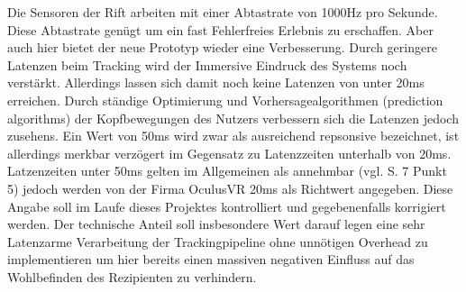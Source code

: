 \documentclass[pagesize, paper=a4, fontsize=12pt,titlepage=true, headings=small, headnosepline, abstractoff, liststotoc, nochapterprefix, plainheadsepline]{scrreprt}
\begin{document}
Die Sensoren der Rift arbeiten mit einer Abtastrate von 1000Hz pro Sekunde. Diese Abtastrate genügt um ein fast Fehlerfreies Erlebnis zu erschaffen. Aber auch hier bietet der neue Prototyp wieder eine Verbesserung. Durch geringere Latenzen beim Tracking wird der Immersive Eindruck des Systems noch verstärkt. Allerdings lassen sich damit noch keine Latenzen von unter 20ms erreichen. Durch ständige Optimierung und Vorhersagealgorithmen (prediction algorithms) der Kopfbewegungen des Nutzers verbessern sich die Latenzen jedoch zusehens. Ein Wert von 50ms wird zwar als ausreichend repsonsive bezeichnet, ist allerdings merkbar verzögert im Gegensatz zu  Latenzzeiten unterhalb von 20ms. Latzenzeiten unter 50ms gelten im Allgemeinen als annehmbar (vgl. \cite{MeRazWhitBro2003} S. 7 Punkt 5) jedoch werden von der Firma OculusVR 20ms als Richtwert angegeben. Diese Angabe soll im Laufe dieses Projektes kontrolliert und gegebenenfalls korrigiert werden. Der technische Anteil soll insbesondere Wert darauf legen eine sehr Latenzarme Verarbeitung der Trackingpipeline ohne unnötigen Overhead zu implementieren um hier bereits einen massiven negativen Einfluss auf das Wohlbefinden des Rezipienten zu verhindern.
\end{document}
